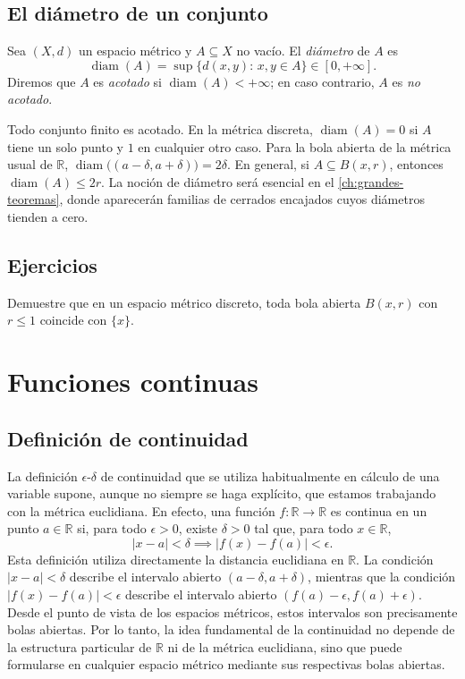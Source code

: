 \subsection{El diámetro de un conjunto}

\begin{definition}
\label{def:diametro}
Sea $(X,d)$ un espacio métrico y $A\subseteq X$ no vacío. El \emph{diámetro} de $A$ es
\[
  \operatorname{diam}(A)=\sup\{d(x,y):\,x,y\in A\}\in[0,+\infty].
\]
Diremos que $A$ es \emph{acotado} si $\operatorname{diam}(A)<+\infty$; en caso contrario, $A$ es \emph{no acotado}.
\end{definition}

Todo conjunto finito es acotado. En la métrica discreta, $\operatorname{diam}(A)=0$ si $A$ tiene un solo punto y $1$ en cualquier otro caso. Para la bola abierta de la métrica usual de $\mathbb{R}$, $\operatorname{diam}\bigl((a-\delta,a+\delta)\bigr)=2\delta$. En general, si $A\subseteq B(x,r)$, entonces $\operatorname{diam}(A)\leq 2r$. La noción de diámetro será esencial en el \cref{ch:grandes-teoremas}, donde aparecerán familias de cerrados encajados cuyos diámetros tienden a cero.

\subsection{Ejercicios}

\begin{exercise}
Demuestre que en un espacio métrico discreto, toda bola abierta $B(x,r)$ con $r\leq 1$ coincide con $\{x\}$.
\end{exercise}

\section{Funciones continuas}
\label{sec:funciones-continuas}

\subsection{Definición de continuidad}

La definición $\epsilon$-$\delta$ de continuidad que se utiliza habitualmente en cálculo de una variable supone, aunque no siempre se haga explícito, que estamos trabajando con la métrica euclidiana. En efecto, una función $f\colon\mathbb{R}\to\mathbb{R}$ es continua en un punto $a\in\mathbb{R}$ si, para todo $\epsilon>0$, existe $\delta>0$ tal que, para todo $x\in\mathbb{R}$,
\[
  |x-a|<\delta\implies|f(x)-f(a)|<\epsilon.
\]
Esta definición utiliza directamente la distancia euclidiana en $\mathbb{R}$. La condición $|x-a|<\delta$ describe el intervalo abierto $(a-\delta,a+\delta)$, mientras que la condición $|f(x)-f(a)|<\epsilon$ describe el intervalo abierto $(f(a)-\epsilon,f(a)+\epsilon)$. Desde el punto de vista de los espacios métricos, estos intervalos son precisamente bolas abiertas. Por lo tanto, la idea fundamental de la continuidad no depende de la estructura particular de $\mathbb{R}$ ni de la métrica euclidiana, sino que puede formularse en cualquier espacio métrico mediante sus respectivas bolas abiertas.

